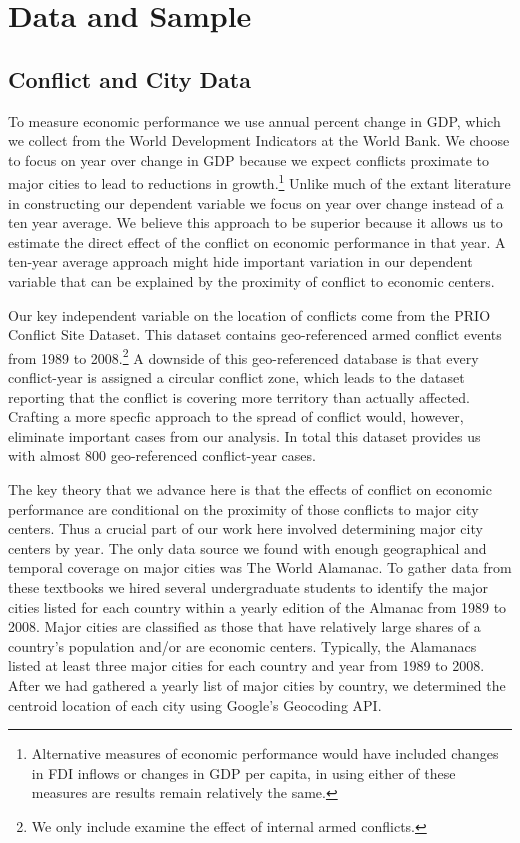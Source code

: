 \section{Data and Sample}
\label{empirics}

\subsection{Conflict and City Data}

To measure economic performance we use annual percent change in GDP, which we collect from the World Development Indicators at the World Bank. We choose to focus on year over change in GDP because we expect conflicts proximate to major cities to lead to reductions in growth.\footnote{Alternative measures of economic performance would have included changes in FDI inflows or changes in GDP per capita, in using either of these measures are results remain relatively the same.} Unlike much of the extant literature in constructing our dependent variable we focus on year over change instead of a ten year average. We believe this approach to be superior because it allows us to estimate the direct effect of the conflict on economic performance in that year. A ten-year average approach might hide important variation in our dependent variable that can be explained by the proximity of conflict to economic centers.

Our key independent variable on the location of conflicts come from the PRIO Conflict Site Dataset. This dataset contains geo-referenced armed conflict events from 1989 to 2008.\footnote{We only include examine the effect of internal armed conflicts.} A downside of this geo-referenced database is that every conflict-year is assigned a circular conflict zone, which leads to the dataset reporting that the conflict is covering more territory than actually affected. Crafting a more specfic approach to the spread of conflict would, however, eliminate important cases from our analysis. In total this dataset provides us with almost 800 geo-referenced conflict-year cases. 

The key theory that we advance here is that the effects of conflict on economic performance are conditional on the proximity of those conflicts to major city centers. Thus a crucial part of our work here involved determining major city centers by year. The only data source we found with enough geographical and temporal coverage on major cities was The World Alamanac. To gather data from these textbooks we hired several undergraduate students to identify the major cities listed for each country within a yearly edition of the Almanac from 1989 to 2008. Major cities are classified as those that have relatively large shares of a country's population and/or are economic centers. Typically, the Alamanacs listed at least three major cities for each country and year from 1989 to 2008. After we had gathered a yearly list of major cities by country, we determined the centroid location of each city using Google's Geocoding API. 


